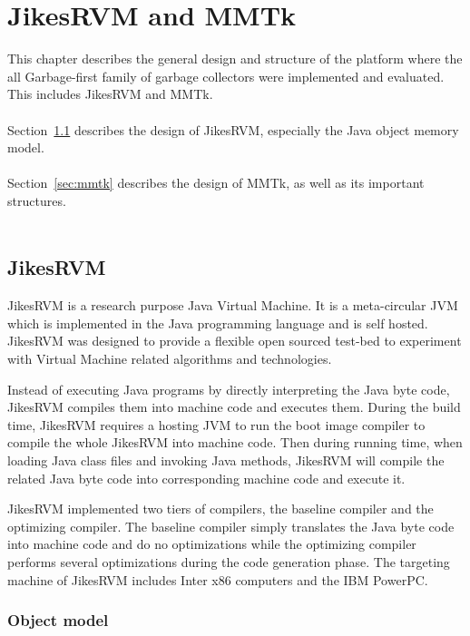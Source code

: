 \chapter{JikesRVM and MMTk}
\label{cha:platform}

This chapter describes the general design and structure of the platform where the all Garbage-first
family of garbage collectors were implemented and evaluated. This includes JikesRVM
and MMTk.
\\\\
Section~\ref{sec:jikesrvm} describes the design of JikesRVM, especially the Java object memory model.
\\\\
Section~\ref{sec:mmtk} describes the design of MMTk, as well as its important structures.
\\\\

\section{JikesRVM}
\label{sec:jikesrvm}

JikesRVM is a research purpose Java Virtual Machine. It is a meta-circular JVM
which is implemented in the Java programming language and is self hosted.
JikesRVM was designed to provide a flexible open sourced test-bed to
experiment with Virtual Machine related algorithms and technologies.

Instead of executing Java programs by directly interpreting the Java byte code,
JikesRVM compiles them into machine code and executes them.
During the build time, JikesRVM requires a hosting JVM to run the boot image compiler
to compile the whole JikesRVM into machine code.
Then during running time, when loading Java class files and invoking Java methods,
JikesRVM will compile the related Java byte code into corresponding machine code and execute it.

JikesRVM implemented two tiers of compilers, the baseline compiler and the optimizing compiler.
The baseline compiler simply translates the Java byte code into machine code and do no
optimizations while the optimizing compiler performs several optimizations during the
code generation phase. The targeting machine of JikesRVM includes Inter x86 computers
and the IBM PowerPC.

\subsection{Object model}

